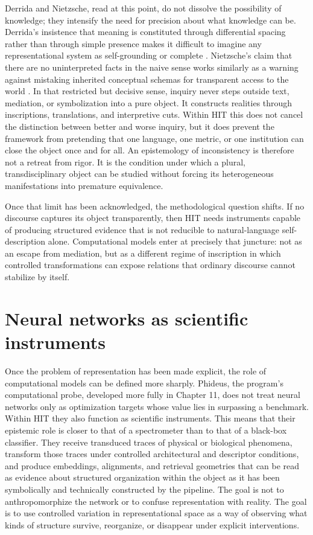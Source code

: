 Derrida and Nietzsche, read at this point, do not dissolve the possibility of knowledge; they intensify the need for precision about what knowledge can be. Derrida's insistence that meaning is constituted through differential spacing rather than through simple presence makes it difficult to imagine any representational system as self-grounding or complete \parencite{derrida_1968}. Nietzsche's claim that there are no uninterpreted facts in the naive sense works similarly as a warning against mistaking inherited conceptual schemas for transparent access to the world \parencite{nietzsche_1873}. In that restricted but decisive sense, inquiry never steps outside text, mediation, or symbolization into a pure object. It constructs realities through inscriptions, translations, and interpretive cuts. Within HIT this does not cancel the distinction between better and worse inquiry, but it does prevent the framework from pretending that one language, one metric, or one institution can close the object once and for all. An epistemology of inconsistency is therefore not a retreat from rigor. It is the condition under which a plural, transdisciplinary object can be studied without forcing its heterogeneous manifestations into premature equivalence.

Once that limit has been acknowledged, the methodological question shifts. If no discourse captures its object transparently, then HIT needs instruments capable of producing structured evidence that is not reducible to natural-language self-description alone. Computational models enter at precisely that juncture: not as an escape from mediation, but as a different regime of inscription in which controlled transformations can expose relations that ordinary discourse cannot stabilize by itself.

\section{Neural networks as scientific instruments}

Once the problem of representation has been made explicit, the role of computational models can be defined more sharply. Phideus, the program's computational probe, developed more fully in Chapter 11, does not treat neural networks only as optimization targets whose value lies in surpassing a benchmark. Within HIT they also function as scientific instruments. This means that their epistemic role is closer to that of a spectrometer than to that of a black-box classifier. They receive transduced traces of physical or biological phenomena, transform those traces under controlled architectural and descriptor conditions, and produce embeddings, alignments, and retrieval geometries that can be read as evidence about structured organization within the object as it has been symbolically and technically constructed by the pipeline. The goal is not to anthropomorphize the network or to confuse representation with reality. The goal is to use controlled variation in representational space as a way of observing what kinds of structure survive, reorganize, or disappear under explicit interventions.

